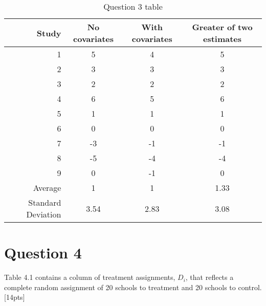 \documentclass[11pt,notitlepage]{article}\usepackage[]{graphicx}\usepackage[]{color}
\begin{document}
\begin{table}[H]
  \centering
  \caption{Question 3 table}
    \begin{tabular}{r|cc|c}
    \toprule
   \multicolumn{1}{r}{Study} & No covariates & \multicolumn{1}{c}{With covariates} & \multicolumn{1}{c}{Greater of two estimates} \\
    \midrule
    1     & 5     & 4     & 5 \\
    2     & 3     & 3     & 3 \\
    3     & 2     & 2     & 2 \\
    4     & 6     & 5     & 6 \\
    5     & 1     & 1     & 1 \\
    6     & 0     & 0     & 0 \\
    7     & -3    & -1    & -1 \\
    8     & -5    & -4    & -4 \\
    9     & 0     & -1    & 0 \\ \midrule
    Average & 1     & 1     & 1.33 \\
    Standard Deviation & 3.54  & 2.83  & 3.08 \\
    \bottomrule
    \end{tabular}%
  \label{tab:addlabel}%
\end{table}%

\section*{Question 4}


Table 4.1 contains a column of treatment assignments, $D_i$, that reflects a complete random assignment of 20 schools to treatment and 20 schools to control. [14pts]
\end{document}
